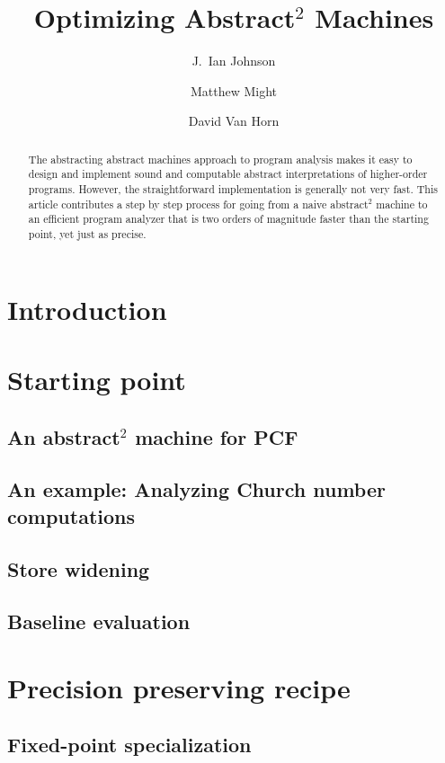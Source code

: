 \documentclass{llncs}
\begin{document}
\title{Optimizing Abstract$^2$ Machines}
%
\frontmatter          %
%
\author{J.~Ian Johnson \and Matthew Might \and David Van Horn}

\maketitle              %

\begin{abstract}
The abstracting abstract machines approach to program analysis makes
it easy to design and implement sound and computable abstract
interpretations of higher-order programs.
%
However, the straightforward implementation is generally
not very fast.
%
This article contributes a step by step process for going from a naive
abstract$^2$ machine to an efficient program analyzer that is two
orders of magnitude faster than the starting point, yet just as
precise.
\end{abstract}
%
\section{Introduction}

\section{Starting point}
\subsection{An abstract$^2$ machine for PCF}
\subsection{An example: Analyzing Church number computations}
\subsection{Store widening}
\subsection{Baseline evaluation}

\section{Precision preserving recipe}
\subsection{Fixed-point specialization}
\end{document}
